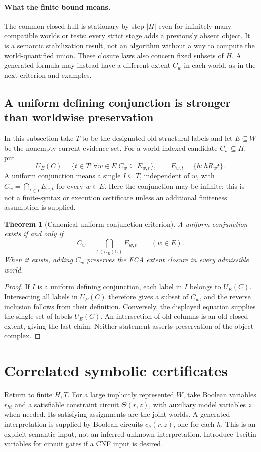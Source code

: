 \documentclass[11pt]{article}
\newtheorem{theorem}{Theorem}[section]
\theoremstyle{definition}
\begin{document}
\paragraph{What the finite bound means.}
The common-closed hull is stationary by step $|H|$ even for infinitely
many compatible worlds or tests: every strict stage adds a previously
absent object. It is a semantic stabilization result, not an algorithm
without a way to compute the world-quantified union. These closure laws
also concern fixed subsets of $H$. A generated formula may instead have a
different extent $C_w$ in each world, as in the next criterion and examples.



\subsection{A uniform defining conjunction is stronger than worldwise preservation}
In this subsection take $T$ to be the designated old structural labels and let $E\subseteq W$ be the nonempty current evidence set. For a world-indexed candidate $C_w\subseteq H$, put
\[
 U_E(C)=\{t\in T:\forall w\in E\; C_w\subseteq E_{w,t}\},\qquad
 E_{w,t}=\{h:hR_wt\}.
\]
A uniform conjunction means a single $I\subseteq T$, independent of $w$,
with $C_w=\bigcap_{t\in I}E_{w,t}$ for every $w\in E$.
Here the conjunction may be infinite; this is not a finite-syntax or
execution certificate unless an additional finiteness assumption is supplied.

\begin{theorem}[Canonical uniform-conjunction criterion]\label{thm:uniform-conjunction}
A uniform conjunction exists if and only if
\[
 C_w=\bigcap_{t\in U_E(C)}E_{w,t}\qquad(w\in E).
\]
When it exists, adding $C_w$ preserves the FCA extent closure in every
admissible world.
\end{theorem}
\begin{proof}
If $I$ is a uniform defining conjunction, each label in $I$ belongs to
$U_E(C)$. Intersecting all labels in $U_E(C)$ therefore gives a subset of
$C_w$, and the reverse inclusion follows from their definition. Conversely,
the displayed equation supplies the single set of labels $U_E(C)$.
An intersection of old columns is an old closed extent, giving the last
claim. Neither statement asserts preservation of the object complex.
\end{proof}



\section{Correlated symbolic certificates}
Return to finite $H,T$. For a large implicitly represented $W$, take Boolean variables $r_{ht}$ and a satisfiable constraint circuit $\Theta(r,z)$, with auxiliary model variables $z$ when needed. Its satisfying assignments are the joint worlds. A generated interpretation is supplied by Boolean circuits $c_h(r,z)$, one for each $h$. This is an explicit semantic input, not an inferred unknown interpretation. Introduce Tseitin variables for circuit gates if a CNF input is desired.
\end{document}
